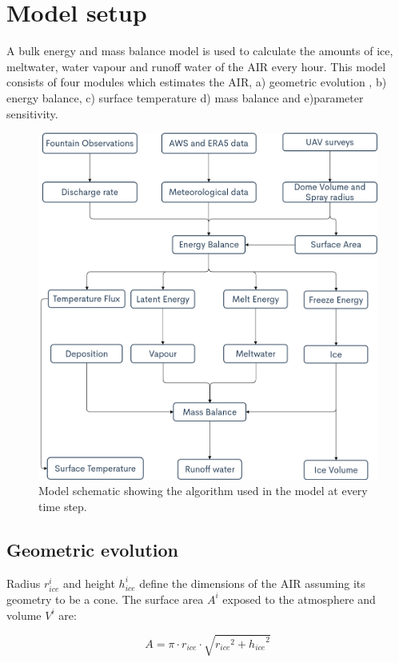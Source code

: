 \documentclass[utf8]{frontiersSCNS} %
\begin{document}
\section{Model setup}

A bulk energy and mass balance model is used to calculate the amounts of ice, meltwater, water vapour and runoff water
of the AIR every hour. This model consists of four modules which estimates the AIR, a) geometric evolution , b) energy
balance, c) surface temperature d) mass balance and e)parameter sensitivity.

\begin{figure} \begin{center} \includegraphics[width=12 cm]{Figures/model_schematic.png} \end{center} \caption{Model
		schematic showing the algorithm used in the model at every time step. } \label{fig:schema} \end{figure}

\subsection{Geometric evolution}

Radius $r_{ice}^i$ and height $h_{ice}^i$ define the dimensions of the AIR assuming its geometry to be a cone. The
surface area $A^i$ exposed to the atmosphere and volume $V^i$ are:

\begin{equation} A = \pi \cdot r_{ice} \cdot \sqrt{{r_{ice}}^2 + {h_{ice}}^ 2} \label{eqn:A} \end{equation}
\end{document}
